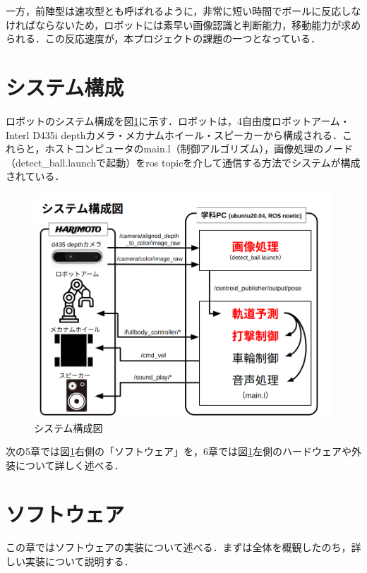 \documentclass[10pt, oneside, titlepage]{ltjarticle}  %
\begin{document}
一方，前陣型は速攻型とも呼ばれるように，非常に短い時間でボールに反応しなければならないため，ロボットには素早い画像認識と判断能力，移動能力が求められる．この反応速度が，本プロジェクトの課題の一つとなっている．

\section{システム構成}
ロボットのシステム構成を図\ref{system}に示す．ロボットは，4自由度ロボットアーム・Interl D435i depthカメラ・メカナムホイール・スピーカーから構成される．これらと，ホストコンピュータのmain.l（制御アルゴリズム），画像処理のノード（detect\_ball.launchで起動）をros topicを介して通信する方法でシステムが構成されている．
\begin{figure}[H]
  \centering
  \includegraphics[width=12cm]{figures/system.png}
  \caption{システム構成図}
  \label{system}
\end{figure}
次の5章では図\ref{system}右側の「ソフトウェア」を，6章では図\ref{system}左側のハードウェアや外装について詳しく述べる．

\section{ソフトウェア}
この章ではソフトウェアの実装について述べる．まずは全体を概観したのち，詳しい実装について説明する．
\end{document}
